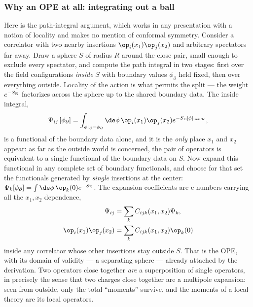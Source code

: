 \subsubsection{Why an OPE at all: integrating out a ball}
\label{sec:ope-ball}

Here is the path-integral argument, which works in any presentation with a
notion of locality and makes no mention of conformal symmetry. Consider a
correlator with two nearby insertions $\op_i(x_1)\op_j(x_2)$ and arbitrary
spectators far away. Draw a sphere $S$ of radius $R$ around the close pair,
small enough to exclude every spectator, and compute the path integral in two
stages: first over the field configurations \emph{inside} $S$ with boundary
values $\phi_\partial$ held fixed, then over everything outside. Locality of
the action is what permits the split --- the weight $e^{-S_{\rm E}}$
factorizes across the sphere up to the shared boundary data. The inside
integral,
\begin{equation}
\Psi_{ij}\left[\phi_\partial\right] =
\int_{\phi|_S = \phi_\partial} \de\phi\,
\op_i(x_1)\op_j(x_2) e^{-S_{\rm E}[\phi]_{\rm inside}},
\label{eq:ball-functional}
\end{equation}
is a functional of the boundary data alone, and it is the \emph{only} place
$x_1$ and $x_2$ appear: as far as the outside world is concerned, the pair
of operators is equivalent to a single functional of the boundary data on
$S$. Now expand this functional in any complete set of boundary functionals,
and choose for that set the functionals generated by \emph{single}
insertions at the center: $\Psi_k[\phi_\partial] = \int
\de\phi\,\op_k(0) e^{-S_{\rm E}}$. The expansion coefficients are
c-numbers carrying all the $x_1, x_2$ dependence,
\begin{equation}
\begin{aligned}
\Psi_{ij} &= \sum_k C_{ijk}(x_1, x_2) \Psi_k,\\
\op_i(x_1)\op_j(x_2) &= \sum_k C_{ijk}(x_1, x_2)\op_k(0)
\end{aligned}
\label{eq:ball-ope}
\end{equation}
inside any correlator whose other insertions stay outside $S$. That is the
OPE, with its domain of validity --- a separating sphere --- already attached
by the derivation. Two operators close together \emph{are} a superposition of
single operators, in precisely the sense that two charges close together are
a multipole expansion: seen from outside, only the total ``moments'' survive,
and the moments of a local theory are its local operators.

